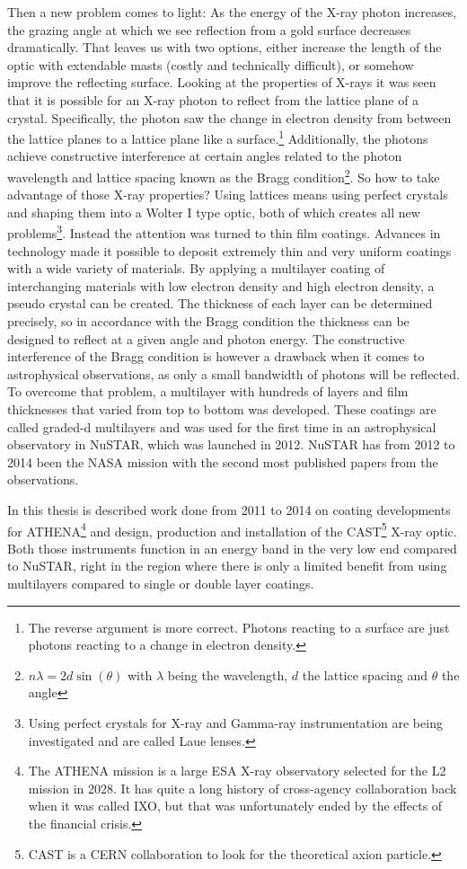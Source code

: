 Then a new problem comes to light: As the energy of the X-ray photon increases, the grazing angle at which we see reflection from a gold surface decreases dramatically. That leaves us with two options, either increase the length of the optic with extendable masts (costly and technically difficult), or somehow improve the reflecting surface. Looking at the properties of X-rays it was seen that it is possible for an X-ray photon to reflect from the lattice plane of a crystal. Specifically, the photon saw the change in electron density from between the lattice planes to a lattice plane like a surface.\footnote{The reverse argument is more correct. Photons reacting to a surface are just photons reacting to a change in electron density.} Additionally, the photons achieve constructive interference at certain angles related to the photon wavelength and lattice spacing known as the Bragg condition\footnote{$n\lambda=2d\sin(\theta)$ with $\lambda$ being the wavelength, $d$ the lattice spacing and $\theta$ the angle}. So how to take advantage of those X-ray properties? Using lattices means using perfect crystals and shaping them into a Wolter I type optic, both of which creates all new problems\footnote{Using perfect crystals for X-ray and Gamma-ray instrumentation are being investigated and are called Laue lenses.}. Instead the attention was turned to thin film coatings. Advances in technology made it possible to deposit extremely thin and very uniform coatings with a wide variety of materials. By applying a multilayer coating of interchanging materials with low electron density and high electron density, a pseudo crystal can be created. The thickness of each layer can be determined precisely, so in accordance with the Bragg condition the thickness can be designed to reflect at a given angle and photon energy. The constructive interference of the Bragg condition is however a drawback when it comes to astrophysical observations, as only a small bandwidth of photons will be reflected. To overcome that problem, a multilayer with hundreds of layers and film thicknesses that varied from top to bottom was developed. These coatings are called graded-d multilayers and was used for the first time in an astrophysical observatory in NuSTAR, which was launched in 2012. NuSTAR has from 2012 to 2014 been the NASA mission with the second most published papers from the observations.

In this thesis is described work done from 2011 to 2014 on coating developments for ATHENA\footnote{The ATHENA mission is a large ESA X-ray observatory selected for the L2 mission in 2028. It has quite a long history of cross-agency collaboration back when it was called IXO, but that was unfortunately ended by the effects of the financial crisis.} and design, production and installation of the CAST\footnote{CAST is a CERN collaboration to look for the theoretical axion particle.} X-ray optic. Both those instruments function in an energy band in the very low end compared to NuSTAR, right in the region where there is only a limited benefit from using multilayers compared to single or double layer coatings.

